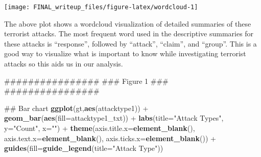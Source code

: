 \documentclass[11pt,letterpaper,]{article}
\newenvironment{Shaded}{\begin{snugshade}}{\end{snugshade}}
\newcommand{\KeywordTok}[1]{\textcolor[rgb]{0.13,0.29,0.53}{\textbf{{#1}}}}
\newcommand{\DataTypeTok}[1]{\textcolor[rgb]{0.13,0.29,0.53}{{#1}}}
\newcommand{\DecValTok}[1]{\textcolor[rgb]{0.00,0.00,0.81}{{#1}}}
\newcommand{\StringTok}[1]{\textcolor[rgb]{0.31,0.60,0.02}{{#1}}}
\newcommand{\OtherTok}[1]{\textcolor[rgb]{0.56,0.35,0.01}{{#1}}}
\newcommand{\NormalTok}[1]{{#1}}
\theoremstyle{definition}
\theoremstyle{definition}
\theoremstyle{definition}
\theoremstyle{remark}
\begin{document}
\begin{Shaded}
\end{Shaded}

\begin{center}\texttt{[image: FINAL\_writeup\_files/figure-latex/wordcloud-1]} \end{center}

The above plot shows a wordcloud visualization of detailed summaries of
these terrorist attacks. The most frequent word used in the descriptive
summaries for these attacks is ``response'', followed by ``attack'',
``claim'', and ``group''. This is a good way to visualize what is
important to know while investigating terrorist attacks so this aids us
in our analysis.



\begin{Shaded}
\begin{Highlighting}[]
\NormalTok{################}
\NormalTok{### Figure 1 ###}
\NormalTok{################}


\NormalTok{## Bar chart}
\KeywordTok{ggplot}\NormalTok{(gt,}\KeywordTok{aes}\NormalTok{(attacktype1)) +}
\StringTok{  }\KeywordTok{geom_bar}\NormalTok{(}\KeywordTok{aes}\NormalTok{(}\DataTypeTok{fill=}\NormalTok{attacktype1_txt)) +}
\StringTok{  }\KeywordTok{labs}\NormalTok{(}\DataTypeTok{title=}\StringTok{"Attack Types"}\NormalTok{, }\DataTypeTok{y=}\StringTok{"Count"}\NormalTok{, }\DataTypeTok{x=}\StringTok{""}\NormalTok{) +}
\StringTok{  }\KeywordTok{theme}\NormalTok{(}\DataTypeTok{axis.title.x=}\KeywordTok{element_blank}\NormalTok{(),}
        \DataTypeTok{axis.text.x=}\KeywordTok{element_blank}\NormalTok{(),}
        \DataTypeTok{axis.ticks.x=}\KeywordTok{element_blank}\NormalTok{()) +}
\StringTok{  }\KeywordTok{guides}\NormalTok{(}\DataTypeTok{fill=}\KeywordTok{guide_legend}\NormalTok{(}\DataTypeTok{title=}\StringTok{"Attack Type"}\NormalTok{))}
\end{Highlighting}
\end{Shaded}
\end{document}
